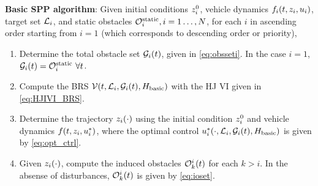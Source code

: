 \begin{alg}
\label{alg:basic}
\textbf{Basic SPP algorithm}: Given initial conditions $z_i^0$, vehicle dynamics $f_i(t, z_i, u_i)$, target set $\mathcal{L}_i$, and static obstacles $\mathcal{O}^\text{static}_i, i = 1\ldots, N$, for each $i$ in ascending order starting from $i=1$ (which corresponds to descending order or priority),
\begin{enumerate}
\item Determine the total obstacle set $\mathcal{G}_i(t)$, given in \eqref{eq:obsseti}. In the case $i=1$, $\mathcal{G}_i(t) = \mathcal{O}^\text{static}_i ~ \forall t$.
\item Compute the BRS $\mathcal{V}(t, \mathcal{L}_i, \mathcal{G}_i(t), H_\text{basic})$ with the HJ VI given in  \eqref{eq:HJIVI_BRS}.
\item Determine the trajectory $z_i(\cdot)$ using the initial condition $z_i^0$ and vehicle dynamics $f(t, z_i, u_i^*)$, where the optimal control  $u_i^*(\cdot, \mathcal{L}_i, \mathcal{G}_i(t), H_\text{basic})$ is given by \eqref{eq:opt_ctrl}.
\item Given $z_i(\cdot)$, compute the induced obstacles $\mathcal{O}_k^i(t)$ for each $k>i$. In the absense of disturbances, $\mathcal{O}_k^i(t)$ is given by \eqref{eq:ioset}.
\end{enumerate}
\end{alg}